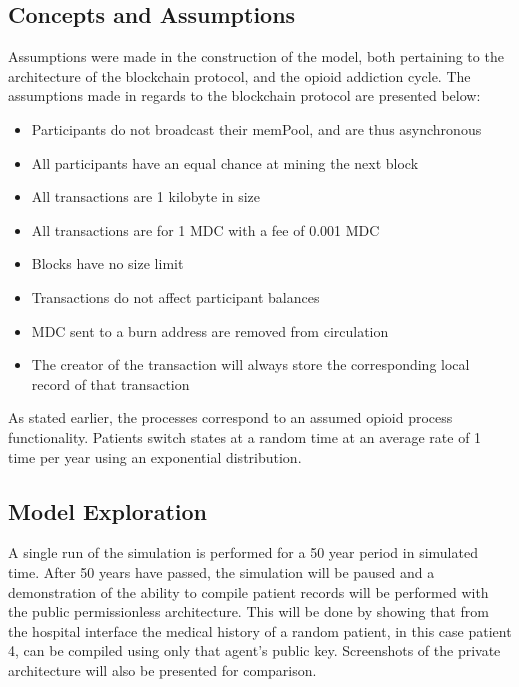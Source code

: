 \documentclass[12pt]{report}
\begin{document}
\subsection{Concepts and Assumptions}
Assumptions were made in the construction of the model, both pertaining to the architecture of the blockchain protocol, and the opioid addiction cycle. The assumptions made in regards to the blockchain protocol are presented below:
\begin{itemize}
\item Participants do not broadcast their memPool, and are thus asynchronous
\item All participants have an equal chance at mining the next block
\item All transactions are 1 kilobyte in size
\item All transactions are for 1 MDC with a fee of 0.001 MDC
\item Blocks have no size limit
\item Transactions do not affect participant balances
\item MDC sent to a burn address are removed from circulation
\item The creator of the transaction will always store the corresponding local record of that transaction
\end{itemize}

As stated earlier, the processes correspond to an assumed opioid process functionality. Patients switch states at a random time at an average rate of 1 time per year using an exponential distribution. %

\subsection{Model Exploration}
A single run of the simulation is performed for a 50 year period in simulated time. After 50 years have passed, the simulation will be paused and a demonstration of the ability to compile patient records will be performed with the public permissionless architecture. This will be done by showing that from the hospital interface the medical history of a random patient, in this case patient 4, can be compiled using only that agent's public key. Screenshots of the private architecture will also be presented for comparison.
\end{document}
